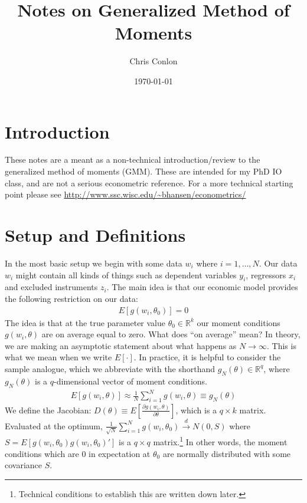\documentclass[a4paper]{article}
\title{Notes on Generalized Method of Moments}
\author{Chris Conlon}
\date{\today}
\begin{document}
\maketitle

\section*{\normalsize Introduction}
These notes are a meant as a non-technical introduction/review to the generalized method of moments (GMM). These are intended for my PhD IO class, and are not a serious econometric reference. For a more technical starting point please see \url{http://www.ssc.wisc.edu/~bhansen/econometrics/}

\section*{\normalsize Setup and Definitions}
In the most basic setup we begin with some data $w_i$ where $i=1,\ldots,N$. Our data $w_i$ might contain all kinds of things such as dependent variables $y_i$, regressors $x_i$ and excluded instruments $z_i$. The main idea is that our economic model provides the following restriction on our data:
\begin{eqnarray*}
E[g(w_i, \theta_0) ] =0
\end{eqnarray*}
The idea is that at the true parameter value $\theta_0\in \mathbb{R}^k$ our moment conditions $g(w_i,\theta)$ are on average equal to zero. What does ``on average'' mean?  In theory, we are making an asymptotic statement about what happens as $N \rightarrow \infty$. This is what we mean when we write $E[\cdot]$. In practice, it is helpful to consider the sample analogue, which we abbreviate with the shorthand $g_N(\theta) \in \mathbb{R}^q$, where $g_N(\theta)$ is a $q$-dimensional vector of moment conditions.
\begin{eqnarray*}
E[g(w_i, \theta )] \approx \frac{1}{N} \sum_{i=1}^N g(w_i, \theta)  \equiv g_N(\theta)
\end{eqnarray*}
We define the Jacobian: $D(\theta) \equiv E[\frac{\partial g(w_i,\theta)}{\partial \theta}]$, which is a $q \times k$ matrix. \\

\noindent Evaluated at the optimum, $\frac{1}{\sqrt{N}} \sum_{i=1}^N g(w_i,\theta_0) \overset{d}{\to} N(0,S)$ where $S = E[g(w_i,\theta_0) g(w_i,\theta_0)']$ is a $q \times q$ matrix.\footnote{Technical conditions to establish this are written down later.} In other words, the moment conditions which are $0$ in expectation at $\theta_0$ are normally distributed with some covariance $S$.\\
\end{document}
